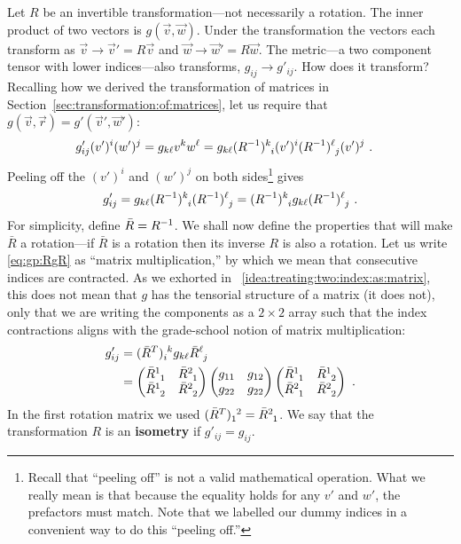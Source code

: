 \documentclass[12pt]{article}
\begin{document}
Let $R$ be an invertible transformation---not necessarily a rotation. The inner product of two vectors is $g(\vec{v},\vec{w})$. Under the transformation the vectors each transform as $\vec{v}\to \vec{v}'= R\vec{v}$ and $\vec{w} \to\vec{w}'= R\vec{w}$. The metric---a two component tensor with lower indices---also transforms, $g_{ij} \to g'_{ij}$. How does it transform? Recalling how we derived the transformation of matrices in Section~\ref{sec:transformation:of:matrices}, let us require that $g(\vec{v},\vec{r}) = g'(\vec{v}', \vec{w}')$:
\begin{align}
    g'_{ij} (v')^i (w')^j 
    &=
    g_{k \ell} v^k w^\ell
    = g_{k\ell} (R\inv)\aij{k}{i}(v')^i (R\inv)\aij{\ell}{j}(v')^j \ .  
\end{align}
Peeling off the $(v')^i$ and $(w')^j$ on both sides\footnote{Recall that ``peeling off'' is not a valid mathematical operation. What we really mean is that because the equality holds for any $v'$ and $w'$, the prefactors must match. Note that we labelled our dummy indices in a convenient way to do this ``peeling off.''} gives
\begin{align}
    g'_{ij} = g_{k\ell} (R\inv)\aij{k}{i} (R\inv)\aij{\ell}{j}
    = 
    (R\inv)\aij{k}{i} g_{k\ell}  (R\inv)\aij{\ell}{j} \ .
    \label{eq:gp:RgR}
\end{align}
For simplicity, define $\bar R = R^{-1}$. We shall now define the properties that will make $\bar R$ a rotation---if $\bar{R}$ is a rotation then its inverse $R$ is also a rotation. Let us write \eqref{eq:gp:RgR} as ``matrix multiplication,'' by which we mean that consecutive indices are contracted. As we exhorted in \bigidearef~\ref{idea:treating:two:index:as:matrix}, this does not mean that $g$ has the tensorial structure of a matrix (it does not), only that we are writing the components as a $2\times 2$ array such that the index contractions aligns with the grade-school notion of matrix multiplication:
\begin{align}
    g'_{ij} &= (\bar R^T)_i^{\phantom{i}k} g_{k\ell} \bar R\aij{\ell}{j} 
    \label{eq:gp:RT:g:R}
\\ &=
    \begin{pmatrix}
        \bar R\aij 11 & \bar R\aij 21 \\
        \bar R\aij 12 & \bar R\aij 22 
    \end{pmatrix}
    \begin{pmatrix}
        g_{11} & g_{12}\\
        g_{22} & g_{22}
    \end{pmatrix}
    \begin{pmatrix}
        \bar R\aij 11 & \bar R\aij 12 \\
        \bar R\aij 21 & \bar R\aij 22 
    \end{pmatrix}
    \ .
\end{align}
In the first rotation matrix we used $(\bar R^T)_1^{\phantom{1}2} = \bar{R}\aij{2}{1}$. We say that the transformation $R$ is an \textbf{isometry} if $g'_{ij} = g_{ij}$. 
\end{document}
